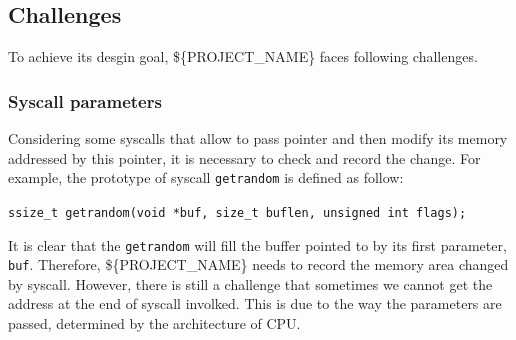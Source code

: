 
\subsection{Challenges}

To achieve its desgin goal, \$\{PROJECT\_NAME\} faces following challenges.


\subsubsection{Syscall parameters}

Considering some syscalls that allow to pass pointer and then modify its memory addressed by this pointer, it is necessary to check and record the change. For example, the prototype of syscall \texttt{getrandom} is defined as follow:\cite{getrandom2}


\centerline{\texttt{ssize\_t getrandom(void *buf, size\_t buflen, unsigned int flags);}}

It is clear that the \texttt{getrandom} will fill the buffer pointed to by its first parameter, \texttt{buf}. Therefore, \$\{PROJECT\_NAME\} needs to record the memory area changed by syscall. However, there is still a challenge that sometimes we cannot get the address at the end of syscall involked. This is due to the way the parameters are passed, determined by the architecture of CPU.

